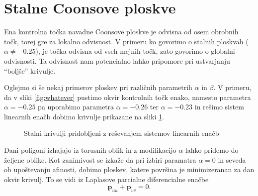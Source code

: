 \documentclass[a4paper,12pt]{article}
\begin{document}
\section{Stalne Coonsove ploskve}
\label{ch:4}

Ena kontrolna točka navadne Coonsove ploskve je odvisna od osem obrobnih točk, 
torej gre za lokalno odvisnost. V primeru ko govorimo o stalnih ploskvah 
($\alpha \neq  -0.25$), je točka odvisna od vseh mejnih točk, zato govorimo 
o globalni odvisnosti. Ta odvisnost nam potencialno lahko pripomore pri ustvarjanju 
``boljše'' krivulje.

Oglejmo si še nekaj primerov ploskev pri različnih parametrih $\alpha$ in $\beta$.
V primeru, da v sliki \ref{fig:whatever} pustimo okvir kontrolnih točk enako,
namesto parametra $\alpha =- 0.25$ pa uporabimo 
parametra $\alpha = -0.26$ ter $\alpha = -0.23$ in rešimo sistem
linearnih enačb dobimo krivulje prikazane na sliki \ref{fig:coons_pospl}.

\begin{figure}[ht!]
   \centering
   \caption{Stalni krivulji pridobljeni z reševanjem sistemov linearnih enačb}
\label{fig:coons_pospl}
\end{figure}

Dani poligoni izhajajo iz torusnih oblik in z modifikacijo $\alpha$ lahko pridemo do željene oblike.
Kot zanimivost se izkaže da pri izbiri paramatra $\alpha = 0$ in seveda ob upoštevanju afinosti,
dobimo ploskev, katere površina je minimizeranan za dan okvir krivulj. To se vidi iz Laplasove parcialne 
diferencialne enačbe
$$\mathbf{p}_{uu} + \mathbf{p}_{vv} = 0.$$
\end{document}
